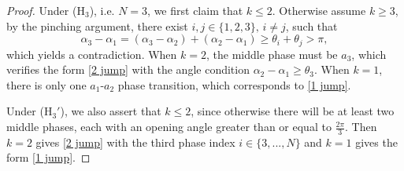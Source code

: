 \documentclass[leqno,11pt]{amsart}
\let\al=\alpha
\let\f=\frac
\theoremstyle{remark}
\begin{document}
\begin{proof}
Under ($\mathrm{H}_3$), i.e. $N=3$, we first claim that $k\leq 2$. Otherwise assume $k\geq 3$, by the pinching argument, there exist $i,j \in\{1,2,3\},\,i\neq j$, such that 
\begin{equation*}
\al_3-\al_1=(\al_3-\al_2)+(\al_2-\al_1)\geq \theta_i+\theta_j>\pi,
\end{equation*}
which yields a contradiction. When $k=2$, the middle phase must be $a_3$, which verifies the form \eqref{2 jump} with the angle condition $\al_2-\al_1\geq \theta_3$. When $k=1$, there is only one $a_1$-$a_2$ phase transition, which corresponds to \eqref{1 jump}.

Under ($\mathrm{H}_3'$), we also assert that $k\leq 2$, since otherwise there will be at least two middle phases, each with an opening angle greater than or equal to $\f{2\pi}{3}$. Then $k=2$ gives \eqref{2 jump} with the third phase index $i\in\{3,...,N\}$ and $k=1$ gives the form \eqref{1 jump}. 


\end{proof}
\end{document}
